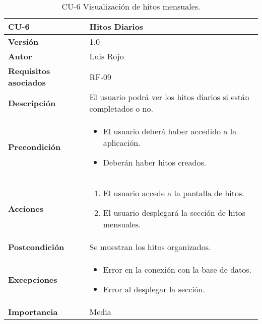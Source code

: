 \begin{table}[p]
	\centering
	\begin{tabularx}{\linewidth}{ p{} p{} }
		\toprule
		\textbf{CU-6}    & \textbf{Hitos Diarios}\\
		\toprule
		\textbf{Versión}              & 1.0    \\
		\textbf{Autor}                & Luis Rojo \\
		\textbf{Requisitos asociados} & RF-09 \\
		\textbf{Descripción}          & El usuario podrá ver los hitos diarios si están completados o no. \\
		\textbf{Precondición}         &
            \begin{itemize}
                \item El usuario deberá haber accedido a la aplicación.
                \item Deberán haber hitos creados.
            \end{itemize}
            \\
		\textbf{Acciones}             &
		\begin{enumerate}
			\def\labelenumi{\arabic{enumi}.}
			\tightlist
			\item El usuario accede a la pantalla de hitos.
			\item El usuario desplegará la sección de hitos mensuales.
		\end{enumerate}\\
		\textbf{Postcondición}        & Se muestran los hitos organizados. \\
		\textbf{Excepciones}          &  
            \begin{itemize}
                \item Error en la conexión con la base de datos.
                \item Error al desplegar la sección.
            \end{itemize}
           \\
		\textbf{Importancia}          & Media  \\
		\bottomrule
	\end{tabularx}
	\caption{CU-6 Visualización de hitos mensuales.}
\end{table}



